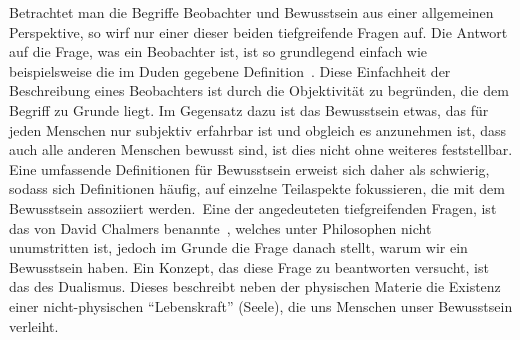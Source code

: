 
Betrachtet man die Begriffe Beobachter und Bewusstsein aus einer 
allgemeinen Perspektive, so wirf nur einer dieser beiden 
tiefgreifende Fragen auf. Die Antwort auf die Frage, was ein Beobachter ist,
ist so grundlegend einfach wie beispielsweise die im
Duden gegebene Definition \,\cite{duden_observer}.
Diese Einfachheit der Beschreibung eines Beobachters ist durch die Objektivität zu begründen,
die dem Begriff zu Grunde liegt. Im Gegensatz dazu ist das Bewusstsein etwas, das für jeden Menschen
nur subjektiv erfahrbar ist und obgleich es anzunehmen ist, dass auch alle anderen Menschen bewusst sind,
ist dies nicht ohne weiteres feststellbar. Eine umfassende Definitionen für Bewusstsein erweist sich daher als 
schwierig, sodass sich Definitionen häufig, auf einzelne Teilaspekte fokussieren, die mit dem Bewusstsein assoziiert 
werden.\,\cite{duden_consciousness}
Eine der angedeuteten tiefgreifenden Fragen, ist das von David Chalmers benannte \,\cite{Chalmers_95}, welches unter Philosophen nicht unumstritten ist, jedoch im Grunde 
die Frage danach stellt, warum wir ein Bewusstsein haben. Ein Konzept, das diese Frage zu beantworten 
versucht, ist das des Dualismus. Dieses beschreibt neben der physischen Materie die Existenz einer nicht-physischen
\enquote{Lebenskraft} (Seele), die uns Menschen unser Bewusstsein verleiht.


